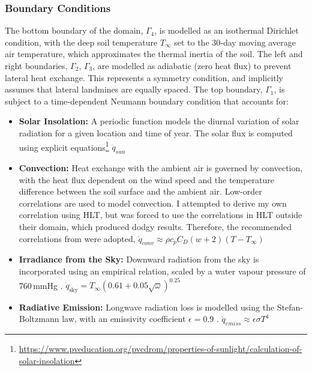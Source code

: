     \subsubsection{Boundary Conditions} 
    
        The bottom boundary of the domain, $\Gamma_4$, is modelled as an isothermal Dirichlet condition, with the deep soil temperature $T_{\infty}$ set to the 30-day moving average air temperature, which approximates the thermal inertia of the soil. The left and right boundaries, $\Gamma_2$, $\Gamma_3$,  are modelled as adiabatic (zero heat flux) to prevent lateral heat exchange. This represents a symmetry condition, and implicitly assumes that lateral landmines are equally spaced. The top boundary, $\Gamma_1$,  is subject to a time-dependent Neumann boundary condition that accounts for:
    
        \begin{itemize}
        
            \item \textbf{Solar Insolation:} A periodic function models the diurnal variation of solar radiation for a given location and time of year. The solar flux is computed using explicit equations\footnote{\url{https://www.pveducation.org/pvcdrom/properties-of-sunlight/calculation-of-solar-insolation}} $\dot{q}_{sun}$
            
            \item \textbf{Convection:} Heat exchange with the ambient air is governed by convection, with the heat flux dependent on the wind speed and the temperature difference between the soil surface and the ambient air. Low-order correlations are used to model convection. I attempted to derive my own correlation using HLT, but was forced to use the correlations in HLT outside their domain, which produced dodgy results. Therefore, the recommended correlations from \cite{kahle1997model} were adopted, $\dot{q}_{conv} \approx \rho c_p C_D(w+2)(T - T_{\infty})$
            
            \item \textbf{Irradiance from the Sky:} Downward radiation from the sky is incorporated using an empirical relation, scaled by a water vapour pressure of 760\,mmHg \cite{nguyen2008inverse}. $\dot{q}_{\text{sky}} = T_{\infty} \left( 0.61 + 0.05 \sqrt{\omega} \right)^{0.25}$
            
            \item \textbf{Radiative Emission:} Longwave radiation loss is modelled using the Stefan-Boltzmann law, with an emissivity coefficient \(\epsilon = 0.9\) \cite{nguyen2008inverse}. $\dot{q}_{emiss} \approx \epsilon \sigma T^4$
            
        \end{itemize}
    
